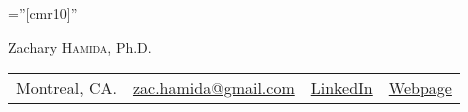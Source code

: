 \documentclass[10pt]{article}
\begin{document}

\pagestyle{empty} %

\font\fb=''[cmr10]'' %

\par{\centering
		{\huge Zachary \textsc{Hamida}, Ph.D.
	}\par}


\begin{tabular}{c|c|c|c}
  \hspace{100pt} Montreal, CA.  & \href{mailto:zac.hamida@gmail.com}{zac.hamida@gmail.com} &
\href{https://www.linkedin.com/in/zacharyhamida/}{LinkedIn}&\href{https://zachamida.github.io}{Webpage}
\end{tabular}

\end{document}
